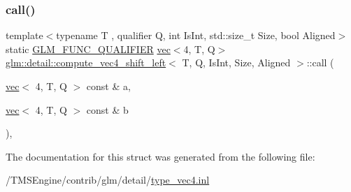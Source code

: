\subsubsection{\texorpdfstring{call()}{call()}}
{\footnotesize\ttfamily template$<$typename T , qualifier Q, int Is\+Int, std\+::size\+\_\+t Size, bool Aligned$>$ \\
static \hyperlink{setup_8hpp_a33fdea6f91c5f834105f7415e2a64407}{G\+L\+M\+\_\+\+F\+U\+N\+C\+\_\+\+Q\+U\+A\+L\+I\+F\+I\+ER} \hyperlink{structglm_1_1vec}{vec}$<$4, T, Q$>$ \hyperlink{structglm_1_1detail_1_1compute__vec4__shift__left}{glm\+::detail\+::compute\+\_\+vec4\+\_\+shift\+\_\+left}$<$ T, Q, Is\+Int, Size, Aligned $>$\+::call (\begin{DoxyParamCaption}\item[{\hyperlink{structglm_1_1vec}{vec}$<$ 4, T, Q $>$ const \&}]{a,  }\item[{\hyperlink{structglm_1_1vec}{vec}$<$ 4, T, Q $>$ const \&}]{b }\end{DoxyParamCaption})\hspace{0.3cm}{\ttfamily [inline]}, {\ttfamily [static]}}



The documentation for this struct was generated from the following file\+:\begin{DoxyCompactItemize}
\item 
/\+T\+M\+S\+Engine/contrib/glm/detail/\hyperlink{type__vec4_8inl}{type\+\_\+vec4.\+inl}\end{DoxyCompactItemize}
